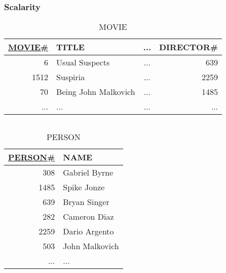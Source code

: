 \documentclass[dvipsnames]{beamer}
\theoremstyle{plain}
\begin{document}
\begin{frame}
  \frametitle{Scalarity}

  \begin{example}
    \begin{tiny}
    \begin{table}
      \caption{MOVIE}
      \begin{tabular}{|r|l|c|r|}\hline
\underline{MOVIE\#} & TITLE                & ... & DIRECTOR\#\\[2pt]\hline\hline
                  6 & Usual Suspects       & ... &        639\\\hline
               1512 & Suspiria             & ... &       2259\\\hline
                 70 & Being John Malkovich & ... &       1485\\\hline
                ... & ...                  & ... &        ...\\\hline
      \end{tabular}
    \end{table}
    \end{tiny}

    \vspace{-12pt}
    \begin{columns}[t]
      \begin{tiny}
      \begin{table}
        \caption{PERSON}
        \begin{tabular}{|r|l|}\hline
\underline{PERSON\#} & NAME          \\[2pt]\hline\hline
                 308 & Gabriel Byrne \\\hline
                1485 & Spike Jonze   \\\hline
                 639 & Bryan Singer  \\\hline
                 282 & Cameron Diaz  \\\hline
                2259 & Dario Argento \\\hline
                 503 & John Malkovich\\\hline
                 ... & ...           \\\hline
        \end{tabular}
      \end{table}
      \end{tiny}


\end{columns}
\end{example}
\end{frame}
\end{document}
